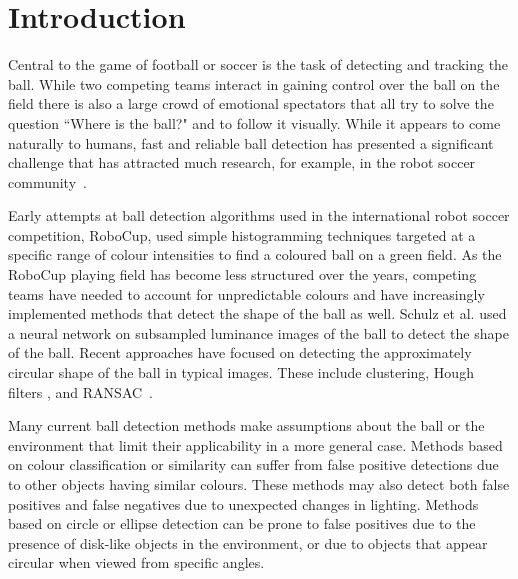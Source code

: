 \documentclass{sig-alternate-05-2015}
\newcommand{\citep}[1]{\cite{#1}}
\newcommand{\citet}[1]{\cite{#1}}
\begin{document}




	\section{Introduction} {
	\label{sec:intro}
Central to the game of football or soccer is the task of detecting and tracking the ball. While	two competing teams interact in gaining control over the ball on the field there is also a large crowd of emotional spectators that all try to solve the question ``Where is the ball?" and to follow it visually. While it appears to come naturally to humans, fast and reliable ball detection has presented a significant challenge that has attracted much research, for example, in the robot soccer community~\cite{KitanoEtAl1997}.





		Early attempts at ball detection algorithms used in the international robot soccer competition, RoboCup, used simple histogramming techniques targeted at a specific range of colour intensities to find a coloured ball on a green field. As the RoboCup playing field has become less structured over the years, competing teams have needed to account for unpredictable colours and have increasingly implemented methods that detect the shape of the ball as well. Schulz et al. \citet{schulz2007ball} used a neural network on subsampled luminance images of the ball to detect the shape of the ball. Recent approaches have focused on detecting the approximately circular shape of the ball in typical images. These include clustering, Hough filters \citep{li2013survey}, and RANSAC~\citep{annable2013nubots}.

		Many current ball detection methods make assumptions about the ball or the environment that limit their applicability in a more general case. Methods based on colour classification or similarity can suffer from false positive detections due to other objects having similar colours. These methods may also detect both false positives and false negatives due to unexpected changes in lighting. Methods based on circle or ellipse detection can be prone to false positives due to the presence of disk-like objects in the environment, or due to objects that appear circular when viewed from specific angles.

}
\end{document}
